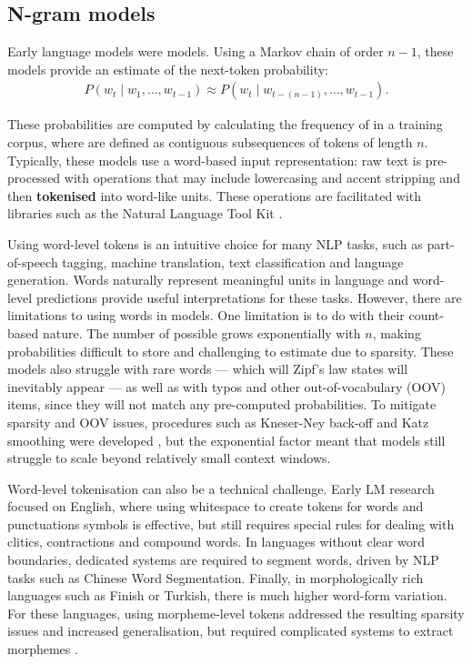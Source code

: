 \subsection{N-gram models}

Early language models were \ngram models. Using a Markov chain of order $n-1$, these models provide an estimate of the next-token probability:
\begin{align}
    P\left(w_t \mid w_1, \dots, w_{t-1} \right) \approx P\left(w_t \mid w_{t-(n-1)}, \dots, w_{t-1}\right).\label{eq:ngram}
\end{align}

These probabilities are computed by calculating the frequency of \ngrams in a training corpus, where \ngrams are defined as contiguous subsequences of tokens of length $n$. Typically, these models use a word-based input representation: raw text is pre-processed with operations that may include lowercasing and accent stripping and then \textbf{tokenised} into word-like units. These operations are facilitated with libraries such as the Natural Language Tool Kit \citep[NLTK;][]{bird2009nltk}. 

Using word-level tokens is an intuitive choice for many NLP tasks, such as part-of-speech tagging, machine translation, text classification and language generation. Words naturally represent meaningful units in language and word-level predictions provide useful interpretations for these tasks. However, there are limitations to using words in \ngram models. One limitation is to do with their count-based nature. The number of possible \ngrams grows exponentially with $n$, making probabilities difficult to store and challenging to estimate due to sparsity. These models also struggle with rare words --- which will Zipf's law states will inevitably appear \citep{zipf_human_1949} --- as well as with typos and other out-of-vocabulary (OOV) items, since they will not match any pre-computed \ngram probabilities. To mitigate sparsity and OOV issues, procedures such as Kneser-Ney back-off and Katz smoothing were developed \citep{ney1994structuring, katz2003estimation}, but the exponential factor meant that \ngram models still struggle to scale beyond relatively small context windows.

Word-level tokenisation can also be a technical challenge. Early LM research focused on English, where using whitespace to create tokens for words and punctuations symbols is effective, but still requires special rules for dealing with clitics, contractions and compound words. In languages without clear word boundaries, dedicated systems are required to segment words, driven by NLP tasks such as Chinese Word Segmentation. Finally, in morphologically rich languages such as Finish or Turkish, there is much higher word-form variation. For these languages, using morpheme-level tokens addressed the resulting sparsity issues and increased generalisation, but required complicated systems to extract morphemes \citep{creutz2005unsupervised,habash2009}. %

